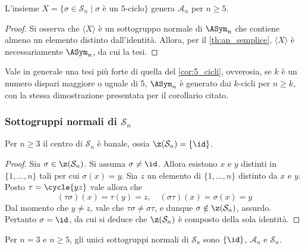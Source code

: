 \documentclass[11pt]{scrartcl}
\begin{document}
	\begin{corollary}
		\label{cor:5_cicli}
		L'insieme $X = \{\sigma \in \mathcal{S}_n\mid \sigma \text{ è un }5\text{-ciclo}\}$ genera
		$\mathcal{A}_n$ per $n \geq 5$.
	\end{corollary}
	
	\begin{proof}
		Si osserva che $\langle X \rangle$ è un sottogruppo normale di
		$\ASym_n$ che contiene almeno un elemento distinto dall'identità.
		Allora, per il \autoref{th:an_semplice}, $\langle X \rangle$ è necessariamente
		$\ASym_n$, da cui la tesi.
	\end{proof}
	
	\begin{remark}
		Vale in generale una tesi più forte di quella del \autoref{cor:5_cicli},
		ovverosia, se $k$ è un numero dispari maggiore o uguale di $5$,
		$\ASym_n$ è generato dai $k$-cicli per $n \geq k$, con la stessa dimostrazione
		presentata per il corollario citato.
	\end{remark}
	
	\subsubsection{Sottogruppi normali di \texorpdfstring{$\mathcal{S}_n$}{Sₙ}}
	
	\begin{lemma}
		\label{lemma1.65}
		Per $n \geq 3$ il centro di $\mathcal{S}_n$ è banale, ossia $\z(\mathcal{S}_n) = \{\id\}$.
	\end{lemma}
	
	\begin{proof}
		Sia $\sigma \in \z(\mathcal{S}_n)$. Si assuma $\sigma \neq \id$.
		Allora esistono $x$ e $y$
		distinti in $\{1, \ldots, n\}$ tali per cui $\sigma(x) = y$. Sia $z$ un elemento
		di $\{1, \ldots, n\}$ distinto da $x$ e $y$. Posto $\tau = \cycle{y z}$
		vale allora che
		\[ (\tau \sigma)(x) = \tau(y) = z, \quad (\sigma \tau)(x) = \sigma(x) = y \]
		Dal momento che $y \neq z$, vale che $\tau \sigma \neq \sigma \tau$, e dunque $\sigma
		\notin \z(\mathcal{S}_n)$, assurdo. Pertanto $\sigma = \id$, da cui si deduce
		che $\z(\mathcal{S}_n)$ è composto
		della sola identità.
	\end{proof}
	
	\begin{proposition}
		\label{prop:sottogruppi_normali_sn}
		Per $n = 3$ e $n \geq 5$, gli unici sottogruppi normali di $\mathcal{S}_n$ sono $\{\id\}$,
		$\mathcal{A}_n$ e $\mathcal{S}_n$.
	\end{proposition}
	
\end{document}
